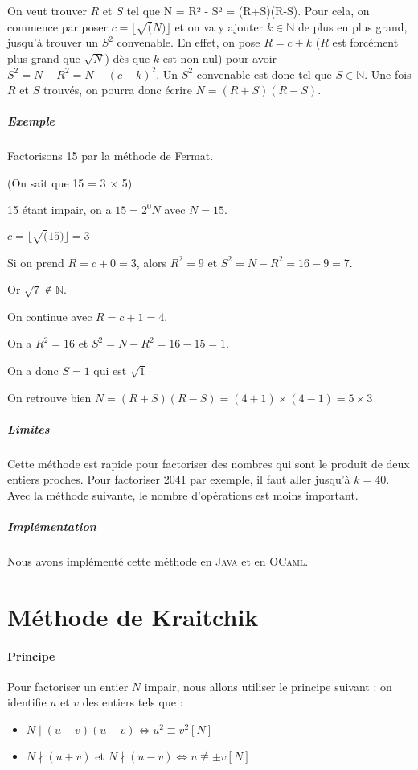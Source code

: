\documentclass[11pt,a4paper]{article}
\begin{document}
	On veut trouver $R$ et $S$ tel que N = R² - S² = (R+S)(R-S). 
	Pour cela, on commence par poser $c = \lfloor \sqrt(N)\rfloor$ et on va y ajouter $k \in \mathbb{N}$ de plus en plus grand, jusqu'à trouver un $S^2$ convenable. En effet, on pose $R = c + k$ ($R$ est forcément plus grand que  $\sqrt{N}$) dès que $k$ est non nul) pour avoir
	$S^{2} = N - R^{2} = N - (c+k)^{2}$.
	Un $S^2$ convenable est donc tel que $S \in \mathbb{N}$. Une fois $R$ et $S$ trouvés, on pourra donc écrire $N = (R+S)(R-S)$.
	
	\subparagraph{Exemple}
	Factorisons 15 par la méthode de Fermat. 
	
	(On sait que 15 = 3 $\times$  5)

	
	15 étant impair, on a $15 = 2^{0}N$ avec $N = 15$.
	
	$c = \lfloor \sqrt(15)\rfloor = 3$
	
	Si on prend $R = c + 0 = 3$, alors $R^2 = 9$ et $S^2 = N - R^2 = 16 - 9 = 7$. 
	
	Or $\sqrt{7} \not\in \mathbb{N}$. 
	
	On continue avec $R = c + 1 = 4$. 
	
	On a $R^2 = 16$ et $S^2 = N - R^2 = 16 - 15 = 1$.
	
	On a donc $S = 1$ qui est $\sqrt 1$
	
	On retrouve bien $N = (R+S)(R-S) = (4+1) \times (4-1) = 5 \times 3$
	
	\subparagraph{Limites}
	Cette méthode est rapide pour factoriser des nombres qui sont le produit de deux entiers proches. Pour factoriser 2041 par exemple, il faut aller jusqu'à $k = 40$. Avec la méthode suivante, le nombre d'opérations est moins important.
	
	\subparagraph{Implémentation}
	Nous avons implémenté cette méthode en \textsc{Java} et en \textsc{OCaml}.

	
	\section{\LARGE{Méthode de Kraitchik}}
	
	\paragraph{Principe}
	Pour factoriser un entier $N$ impair, nous allons utiliser le principe suivant : on identifie $u$ et $v$ des entiers tels que :
	\begin{itemize}
		\item $N \mid(u+v)(u-v) \iff u^2 \equiv v^2 [N]$
		\item $N \nmid(u+v)$ et $ N \nmid(u-v) \iff u \not\equiv \pm v [N]$ 
	\end{itemize}
	
\end{document}
